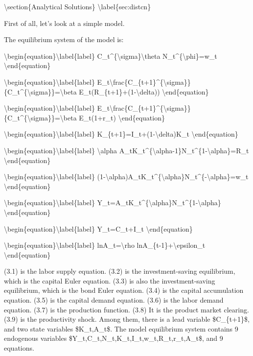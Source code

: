 \documentclass[10pt,math=newtx,citestyle=gb7714-2015,bibstyle=gb7714-2015]{elegantbook}
\begin{document}
	
	\textbackslash{}section\{Analytical Solutions\} \textbackslash{}label\{sec:distcn\}
	
	First of all, let's look at a simple model.
	
	The equilibrium system of the model is:
	
	\textbackslash{}begin\{equation\}\textbackslash{}label\{label\}
	C\_t\^{}\{\textbackslash{}sigma\}\textbackslash{}theta N\_t\^{}\{\textbackslash{}phi\}=w\_t
	\textbackslash{}end\{equation\}
	
	\textbackslash{}begin\{equation\}\textbackslash{}label\{label\}
	E\_t\textbackslash{}frac\{C\_\{t+1\}\^{}\{\textbackslash{}sigma\}\}\{C\_t\^{}\{\textbackslash{}sigma\}\}=\textbackslash{}beta E\_t(R\_\{t+1\}+(1-\textbackslash{}delta))
	\textbackslash{}end\{equation\}
	
	\textbackslash{}begin\{equation\}\textbackslash{}label\{label\}
	E\_t\textbackslash{}frac\{C\_\{t+1\}\^{}\{\textbackslash{}sigma\}\}\{C\_t\^{}\{\textbackslash{}sigma\}\}=\textbackslash{}beta E\_t(1+r\_t)
	\textbackslash{}end\{equation\}
	
	\textbackslash{}begin\{equation\}\textbackslash{}label\{label\}
	K\_\{t+1\}=I\_t+(1-\textbackslash{}delta)K\_t
	\textbackslash{}end\{equation\}
	
	\textbackslash{}begin\{equation\}\textbackslash{}label\{label\}
	\textbackslash{}alpha A\_tK\_t\^{}\{\textbackslash{}alpha-1\}N\_t\^{}\{1-\textbackslash{}alpha\}=R\_t
	\textbackslash{}end\{equation\}
	
	\textbackslash{}begin\{equation\}\textbackslash{}label\{label\}
	(1-\textbackslash{}alpha)A\_tK\_t\^{}\{\textbackslash{}alpha\}N\_t\^{}\{-\textbackslash{}alpha\}=w\_t
	\textbackslash{}end\{equation\}
	
	\textbackslash{}begin\{equation\}\textbackslash{}label\{label\}
	Y\_t=A\_tK\_t\^{}\{\textbackslash{}alpha\}N\_t\^{}\{1-\textbackslash{}alpha\}
	\textbackslash{}end\{equation\}
	
	\textbackslash{}begin\{equation\}\textbackslash{}label\{label\}
	Y\_t=C\_t+I\_t
	\textbackslash{}end\{equation\}
	
	\textbackslash{}begin\{equation\}\textbackslash{}label\{label\}
	lnA\_t=\textbackslash{}rho lnA\_\{t-1\}+\textbackslash{}epsilon\_t
	\textbackslash{}end\{equation\}
	
	(3.1) is the labor supply equation. (3.2) is the investment-saving equilibrium, which is the capital Euler equation. (3.3) is also the investment-saving equilibrium, which is the bond Euler equation. (3.4) is the capital accumulation equation. (3.5) is the capital demand equation. (3.6) is the labor demand equation. (3.7) is the production function. (3.8) It is the product market clearing. (3.9) is the productivity shock. Among them, there is a lead variable \$C\_\{t+1\}\$, and two state variables \$K\_t,A\_t\$. The model equilibrium system contains 9 endogenous variables \$Y\_t,C\_t,N\_t,K\_t,I\_t,w\_t,R\_t,r\_t,A\_t\$, and 9 equations.
	
\end{document}
